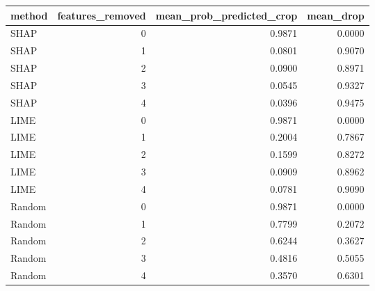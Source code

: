 \begin{tabular}{lrrr}
\toprule
method & features_removed & mean_prob_predicted_crop & mean_drop \\
\midrule
SHAP & 0 & 0.9871 & 0.0000 \\
SHAP & 1 & 0.0801 & 0.9070 \\
SHAP & 2 & 0.0900 & 0.8971 \\
SHAP & 3 & 0.0545 & 0.9327 \\
SHAP & 4 & 0.0396 & 0.9475 \\
LIME & 0 & 0.9871 & 0.0000 \\
LIME & 1 & 0.2004 & 0.7867 \\
LIME & 2 & 0.1599 & 0.8272 \\
LIME & 3 & 0.0909 & 0.8962 \\
LIME & 4 & 0.0781 & 0.9090 \\
Random & 0 & 0.9871 & 0.0000 \\
Random & 1 & 0.7799 & 0.2072 \\
Random & 2 & 0.6244 & 0.3627 \\
Random & 3 & 0.4816 & 0.5055 \\
Random & 4 & 0.3570 & 0.6301 \\
\bottomrule
\end{tabular}
